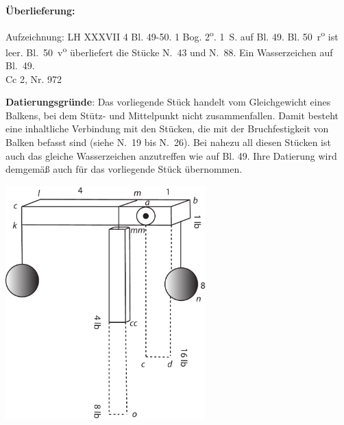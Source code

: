 \begin{ledgroupsized}[r]{120mm}
\footnotesize 
\pstart  
\noindent\textbf{\"{U}berlieferung:}  
\pend
\end{ledgroupsized}
%
\begin{ledgroupsized}[r]{114mm}
\footnotesize 
\pstart
\parindent -6mm
Aufzeichnung: LH XXXVII 4 Bl. 49-50. 1 Bog. 2\textsuperscript{o}. 1\, S. auf Bl. 49. Bl. 50~r\textsuperscript{o} ist leer. Bl.~50~v\textsuperscript{o} überliefert die Stücke %
N.~43 und N.~88. Ein Wasserzeichen
auf Bl.~49.%
\\
Cc 2, Nr. 972
\pend
\end{ledgroupsized}
%
\vspace*{5mm}
%
\begin{ledgroup}
\footnotesize
\pstart
\noindent\footnotesize{\textbf{Datierungsgr\"{u}nde}: Das vorliegende Stück handelt vom Gleichgewicht eines Balkens, bei dem Stütz- und Mittelpunkt nicht zusammenfallen. Damit besteht eine inhaltliche Verbindung mit den Stücken, die mit der Bruchfestigkeit von Balken befasst sind (siehe N.~19 bis N.~26).
Bei nahezu all diesen Stücken ist auch das gleiche Wasserzeichen anzutreffen wie auf Bl. 49. Ihre Datierung wird demgemäß auch für das vorliegende Stück übernommen.}
\pend
\end{ledgroup}
%
\vspace{8mm}%
\pstart
\noindent
[49~r\textsuperscript{o}]
\pend
\vspace{0.5em}
\pstart 
\centering
\includegraphics[width=0.58\textwidth]{images/LH37,4_49r-1.pdf}
